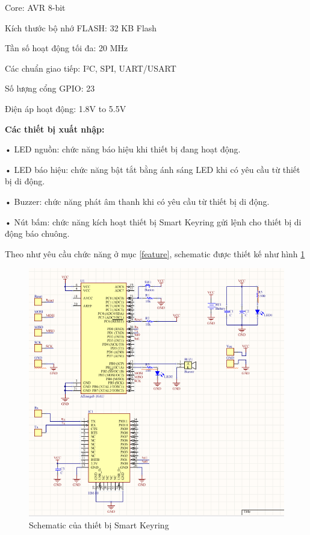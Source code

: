 Core:	 AVR 8-bit

Kích thước bộ nhớ FLASH:	 32 KB Flash

Tần số hoạt động tối đa:	 20 MHz

Các chuẩn giao tiếp:	 I²C, SPI, UART/USART

Số lượng cổng GPIO:	 23

Điện áp hoạt động:	 1.8V to 5.5V

\textbf{Các thiết bị xuất nhập:}

• LED nguồn: chức năng báo hiệu khi thiết bị đang hoạt động.

• LED báo hiệu: chức năng bật tắt bằng ánh sáng LED khi có yêu cầu từ thiết bị di động.

• Buzzer: chức năng phát âm thanh khi có yêu cầu từ thiết bị di động.

• Nút bấm: chức năng kích hoạt thiết bị Smart Keyring gửi lệnh cho thiết bị di động báo chuông.

Theo như yêu cầu chức năng ở mục \ref{feature}, schematic được thiết kế như hình \ref{fig: schematic}

	\begin{figure}[!ht]
		\centering    
		\includegraphics[width=1.0\textwidth]{schematic}
		\caption[Schematic của thiết bị Smart Keyring]{Schematic của thiết bị Smart Keyring}
		\label{fig: schematic}
	\end{figure}


